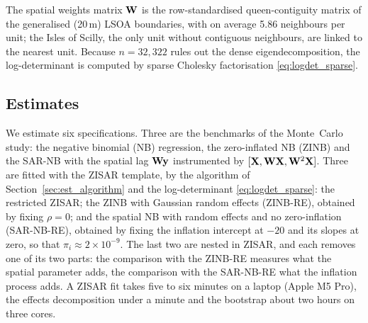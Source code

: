 The spatial weights matrix $\mathbf{W}$ is the row-standardised queen-contiguity matrix of the generalised (20\,m) LSOA boundaries, with on average 5.86 neighbours per unit; the Isles of Scilly, the only unit without contiguous neighbours, are linked to the nearest unit.
Because $n = 32{,}322$ rules out the dense eigendecomposition, the log-determinant is computed by sparse Cholesky factorisation \eqref{eq:logdet_sparse}.

\subsection{Estimates}\label{sec:solar_results}

We estimate six specifications.
Three are the benchmarks of the Monte~Carlo study: the negative binomial (NB) regression, the zero-inflated NB (ZINB) and the SAR-NB with the spatial lag $\mathbf{W}\mathbf{y}$ instrumented by $[\mathbf{X},\mathbf{W}\mathbf{X},\mathbf{W}^2\mathbf{X}]$.
Three are fitted with the ZISAR template, by the algorithm of Section~\ref{sec:est_algorithm} and the log-determinant \eqref{eq:logdet_sparse}: the restricted ZISAR; the ZINB with Gaussian random effects (ZINB-RE), obtained by fixing $\rho = 0$; and the spatial NB with random effects and no zero-inflation (SAR-NB-RE), obtained by fixing the inflation intercept at $-20$ and its slopes at zero, so that $\pi_i \approx 2\times 10^{-9}$.
The last two are nested in ZISAR, and each removes one of its two parts: the comparison with the ZINB-RE measures what the spatial parameter adds, the comparison with the SAR-NB-RE what the inflation process adds.
A ZISAR fit takes five to six minutes on a laptop (Apple M5 Pro), the effects decomposition under a minute and the bootstrap about two hours on three cores.

